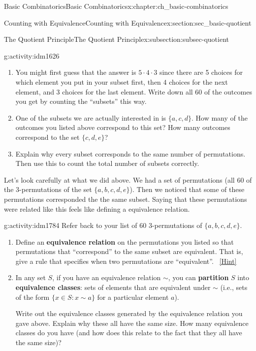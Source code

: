 \documentclass[oneside,10pt,]{book}
\newcommand{\terminology}[1]{\textbf{#1}}
\numberwithin{equation}{chapter}
\def\st{:}
\begin{document}
\begin{chapterptx}{Basic Combinatorics}{}{Basic Combinatorics}{}{}{x:chapter:ch_basic-combinatorics}
\begin{sectionptx}{Counting with Equivalence}{}{Counting with Equivalence}{}{}{x:section:sec_basic-quotient}
\begin{subsectionptx}{The Quotient Principle}{}{The Quotient Principle}{}{}{x:subsection:subsec-quotient}
\begin{activity}{}{g:activity:idm1626}
\begin{enumerate}[font=\bfseries,label=(\alph*),ref=\alph*]
\item{}You might first guess that the answer is \(5\cdot 4 \cdot 3\) since there are 5 choices for which element you put in your subset first, then  4 choices for the next element, and 3 choices for the last element.  Write down all 60 of the outcomes you get by counting the ``subsets'' this way.\footnotemark{}%
\item{}One of the subsets we are actually interested in is \(\{a,c,d\}\).  How many of the outcomes you listed above correspond to this set?  How many outcomes correspond to the set \(\{c,d,e\}\)?%
\item{}Explain why every subset corresponds to the same number of permutations.  Then use this to count the total number of subsets correctly.%
\end{enumerate}
\end{activity}
%
Let's look carefully at what we did above.  We had a set of permutations (all 60 of the 3-permutations of the set \(\{a,b,c,d,e\}\)).  Then we noticed that some of these permutations corresponded the the same subset.  Saying that these permutations were related like this feels like defining a equivalence relation.%
\begin{activity}{}{g:activity:idm1784}%
Refer back to your list of 60 3-permutations of \(\{a,b,c,d,e\}\).%
\begin{enumerate}[font=\bfseries,label=(\alph*),ref=\alph*]
\item{}Define an \terminology{equivalence relation} on the permutations you listed so that permutations that ``correspond'' to the same subset are equivalent.  That is, give a rule that specifies when two permutations are ``equivalent''.%
\qquad~\hfill{\tiny\hyperlink{g:hint:idm1794-back}{[Hint]}}\item{}In any set \(S\), if you have an equivalence relation \(\sim\), you can \terminology{partition} \(S\) into \terminology{equivalence classes}: sets of elements that are equivalent under \(\sim\) (i.e., sets of the form \(\{x \in S \st x \sim a\} \) for a particular element \(a\)).%
\par
Write out the equivalence classes generated by the equivalence relation you gave above.  Explain why these all have the same size.  How many equivalence classes do you have (and how does this relate to the fact that they all have the same size)?%

\end{enumerate}
\end{activity}
\end{subsectionptx}
\end{sectionptx}
\end{chapterptx}
\end{document}
